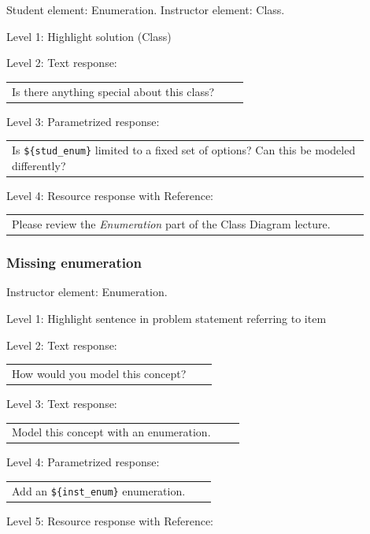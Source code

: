 Student element: Enumeration. Instructor element: Class. \medskip

\noindent Level 1: Highlight solution (Class) \medskip

\noindent Level 2: Text response: \medskip

\begin{tabular}{|p{0.9\linewidth}}
Is there anything special about this class?
\end{tabular} \medskip

\noindent Level 3: Parametrized response: \medskip

\begin{tabular}{|p{0.9\linewidth}}
Is \verb|${stud_enum}| limited to a fixed set of options? Can this be modeled differently?
\end{tabular} \medskip

\noindent Level 4: Resource response with Reference: \medskip

\begin{tabular}{|p{0.9\linewidth}}
Please review the \textit{Enumeration} part of the Class Diagram lecture.
\end{tabular} \medskip


\subsubsection{Missing enumeration}

Instructor element: Enumeration. \medskip

\noindent Level 1: Highlight sentence in problem statement referring to item \medskip

\noindent Level 2: Text response: \medskip

\begin{tabular}{|p{0.9\linewidth}}
How would you model this concept?
\end{tabular} \medskip

\noindent Level 3: Text response: \medskip

\begin{tabular}{|p{0.9\linewidth}}
Model this concept with an enumeration.
\end{tabular} \medskip

\noindent Level 4: Parametrized response: \medskip

\begin{tabular}{|p{0.9\linewidth}}
Add an \verb|${inst_enum}| enumeration.
\end{tabular} \medskip

\noindent Level 5: Resource response with Reference: \medskip

